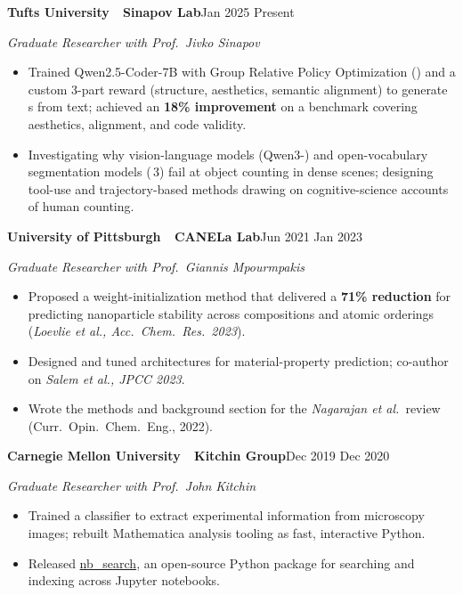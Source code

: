 \documentclass[10pt,letterpaper]{article}
\newcommand{\sansfam}{\sffamily}
\newcommand{\monofam}{\ttfamily}
\newcommand{\bdash}{\,\textemdash\,}
\newcommand{\datestamp}[1]{{\sansfam\footnotesize\color{meta}\figureversion{lf}#1}}
\newcommand{\role}[2]{%
  \filbreak%
  \par\vspace{1pt}%
  \noindent\textbf{#1}\hfill\datestamp{#2}\par\nopagebreak}
\newcommand{\sub}[1]{\noindent\textit{\footnotesize\color{meta} #1}\par\nopagebreak}
\newcommand{\acro}[1]{\textls[80]{#1}}
\begin{document}
\role{Tufts University \bdash{} Sinapov Lab}{Jan 2025 \textendash{} Present}
\sub{Graduate Researcher with Prof.\ Jivko Sinapov}
\begin{itemize}
  \item Trained Qwen2.5-Coder-7B with Group Relative Policy Optimization (\acro{GRPO}) and a custom 3-part reward (structure, aesthetics, semantic alignment) to generate \acro{SVG}s from text; achieved an \textbf{18\% improvement} on a benchmark covering aesthetics, alignment, and code validity.
  \item Investigating why vision-language models (Qwen3-\acro{VL}) and open-vocabulary segmentation models (\acro{SAM}\,3) fail at object counting in dense scenes; designing tool-use and trajectory-based methods drawing on cognitive-science accounts of human counting.
\end{itemize}

\role{University of Pittsburgh \bdash{} CANELa Lab}{Jun 2021 \textendash{} Jan 2023}
\sub{Graduate Researcher with Prof.\ Giannis Mpourmpakis}
\begin{itemize}
  \item Proposed a weight-initialization method that delivered a \textbf{71\% \acro{RMSE} reduction} for predicting nanoparticle stability across compositions and atomic orderings (\emph{Loevlie et al., Acc.\ Chem.\ Res.\ 2023}).
  \item Designed and tuned \acro{ML} architectures for material-property prediction; co-author on \emph{Salem et al., JPCC 2023}.
  \item Wrote the \acro{ML} methods and background section for the \emph{Nagarajan et al.}\ review (Curr.\ Opin.\ Chem.\ Eng., 2022).
\end{itemize}

\role{Carnegie Mellon University \bdash{} Kitchin Group}{Dec 2019 \textendash{} Dec 2020}
\sub{Graduate Researcher with Prof.\ John Kitchin}
\begin{itemize}
  \item Trained a \acro{CNN} classifier to extract experimental information from microscopy images; rebuilt Mathematica analysis tooling as fast, interactive Python.
  \item Released \href{https://tinyurl.com/yzpperdc}{\monofam nb\_search}, an open-source Python package for searching and indexing across Jupyter notebooks.
\end{itemize}

\end{document}

